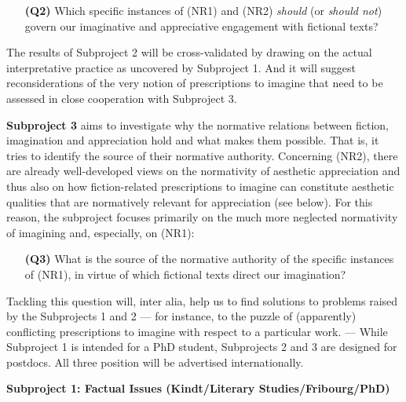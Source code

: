 \vspace{-.1cm}
\begin{itemize}[leftmargin=2cm]
\item[\textbf{(Q2)}] Which specific instances of (NR1) and (NR2) \emph{should} (or \emph{should not}) govern our imaginative and appreciative engagement with fictional texts?
\end{itemize}
\vspace{-.1cm}

\noindent The results of Subproject 2 will be cross-validated by drawing on the actual interpretative practice as uncovered by Subproject 1. And it will suggest reconsiderations of the very notion of prescriptions to imagine that need to be assessed in close cooperation with Subproject 3.

\vspace{.2cm}
\noindent\textbf{Subproject 3} aims to investigate why the normative relations between fiction, imagination and appreciation hold and what makes them possible. That is, it tries to identify the source of their normative authority. Concerning (NR2), there are already well-developed views on the normativity of aesthetic appreciation and thus also on how fiction-related prescriptions to imagine can constitute aesthetic qualities that are normatively relevant for appreciation (see below). For this reason, the subproject focuses primarily on the much more neglected normativity of imagining and, especially, on (NR1): 

\vspace{-.1cm}
\begin{itemize}[leftmargin=2cm]
\item[\textbf{(Q3)}] What is the source of the normative authority of the specific instances of (NR1), in virtue of which fictional texts direct our imagination?
\end{itemize}
\vspace{-.1cm}

\noindent Tackling this question will, inter alia, help us to find solutions to problems raised by the Subprojects 1 and 2 --- for instance, to the puzzle of (apparently) conflicting prescriptions to imagine with respect to a particular work. --- While Subproject 1 is intended for a PhD student, Subprojects 2 and 3 are designed for postdocs. All three position will be advertised internationally.

\vspace{.2cm}
\noindent\textbf{Subproject 1: Factual Issues (Kindt/Literary Studies/Fribourg/PhD)}
\vspace{.2cm}

